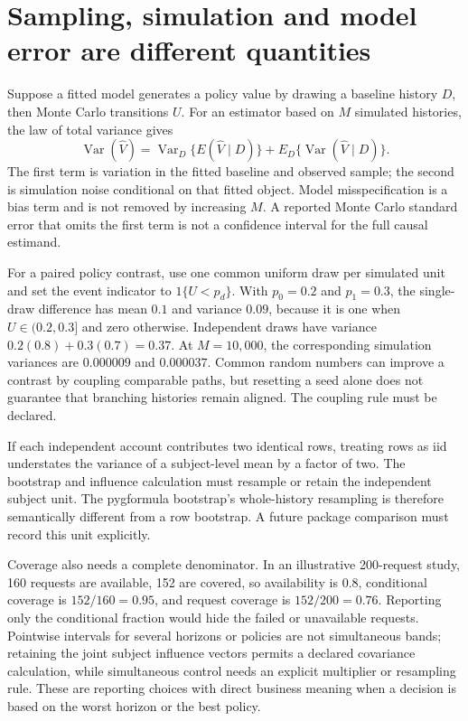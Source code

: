 \section{Sampling, simulation and model error are different quantities}
\label{exec17:s5-uncertainty}

Suppose a fitted model generates a policy value by drawing a baseline history
$D$, then Monte Carlo transitions $U$. For an estimator based on $M$ simulated
histories, the law of total variance gives
\begin{equation}
 \operatorname{Var}(\widehat V)=
 \operatorname{Var}_D\{E(\widehat V\mid D)\}+
 E_D\{\operatorname{Var}(\widehat V\mid D)\}.
 \label{exec17:s5-total-variance}
\end{equation}
The first term is variation in the fitted baseline and observed sample; the
second is simulation noise conditional on that fitted object. Model
misspecification is a bias term and is not removed by increasing $M$. A
reported Monte Carlo standard error that omits the first term is not a
confidence interval for the full causal estimand.

For a paired policy contrast, use one common uniform draw per simulated unit
and set the event indicator to $1\{U<p_d\}$. With $p_0=0.2$ and $p_1=0.3$, the
single-draw difference has mean $0.1$ and variance $0.09$, because it is one
when $U\in(0.2,0.3]$ and zero otherwise. Independent draws have variance
$0.2(0.8)+0.3(0.7)=0.37$. At $M=10{,}000$, the corresponding simulation
variances are $0.000009$ and $0.000037$. Common random numbers can improve a
contrast by coupling comparable paths, but resetting a seed alone does not
guarantee that branching histories remain aligned. The coupling rule must be
declared.

If each independent account contributes two identical rows, treating rows as
iid understates the variance of a subject-level mean by a factor of two. The
bootstrap and influence calculation must resample or retain the independent
subject unit. The pygformula bootstrap's whole-history resampling is therefore
semantically different from a row bootstrap. A future package comparison must
record this unit explicitly.\citep{v13_sw_pygformula,exec17_s5_math}

Coverage also needs a complete denominator. In an illustrative 200-request
study, 160 requests are available, 152 are covered, so availability is $0.8$,
conditional coverage is $152/160=0.95$, and request coverage is $152/200=0.76$.
Reporting only the conditional fraction would hide the failed or unavailable
requests. Pointwise intervals for several horizons or policies are not
simultaneous bands; retaining the joint subject influence vectors permits a
declared covariance calculation, while simultaneous control needs an explicit
multiplier or resampling rule. These are reporting choices with direct business
meaning when a decision is based on the worst horizon or the best policy.


